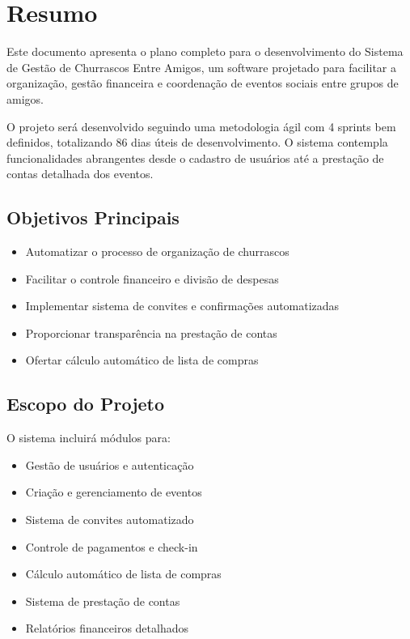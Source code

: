 \section{Resumo}

Este documento apresenta o plano completo para o desenvolvimento do Sistema de Gestão de Churrascos Entre Amigos, um software projetado para facilitar a organização, gestão financeira e coordenação de eventos sociais entre grupos de amigos.

O projeto será desenvolvido seguindo uma metodologia ágil com 4 sprints bem definidos, totalizando 86 dias úteis de desenvolvimento. O sistema contempla funcionalidades abrangentes desde o cadastro de usuários até a prestação de contas detalhada dos eventos.

\subsection{Objetivos Principais}
\begin{itemize}
    \item Automatizar o processo de organização de churrascos
    \item Facilitar o controle financeiro e divisão de despesas
    \item Implementar sistema de convites e confirmações automatizadas
    \item Proporcionar transparência na prestação de contas
    \item Ofertar cálculo automático de lista de compras
\end{itemize}

\subsection{Escopo do Projeto}
O sistema incluirá módulos para:
\begin{itemize}
    \item Gestão de usuários e autenticação
    \item Criação e gerenciamento de eventos
    \item Sistema de convites automatizado
    \item Controle de pagamentos e check-in
    \item Cálculo automático de lista de compras
    \item Sistema de prestação de contas
    \item Relatórios financeiros detalhados
\end{itemize}

